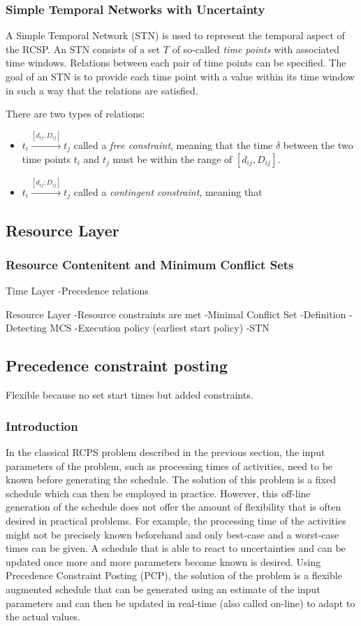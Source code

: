\documentclass{article}
\begin{document}
\subsubsection{Simple Temporal Networks with Uncertainty}
A Simple Temporal Network (STN) is used to represent the temporal aspect of the RCSP. An STN consists of a set $T$ of so-called \emph{time points} with associated time windows. Relations between each pair of time points can be specified. The goal of an STN is to provide each time point with a value within its time window in such a way that the relations are satisfied. 

There are two types of relations:
\begin{itemize}
\item $t_i \xrightarrow{[d_{ij},D_{ij}]} t_j$ called a \emph{free constraint}, meaning that the time $\delta$ between the two time points $t_i$ and $t_j$ must be within the range of $[d_{ij},D_{ij}]$.
\item $t_i \xrightarrow{[d_{ij}:D_{ij}]} t_j$ called a \emph{contingent constraint}, meaning that 
\end{itemize}

\subsection{Resource Layer}
\subsubsection{Resource Contenitent and Minimum Conflict Sets}


Time Layer
-Precedence relations

Resource Layer
-Resource constraints are met
-Minimal Conflict Set
	-Definition
-Detecting MCS
	-Execution policy (earliest start policy)
	-STN
	

\subsection{Precedence constraint posting}
Flexible because no set start times but added constraints.

\subsubsection{Introduction}
In the classical RCPS problem described in the previous section, the input parameters of the problem, such as processing times of activities, need to be known before generating the schedule. The solution of this problem is a fixed schedule which can then be employed in practice. However, this off-line generation of the schedule does not offer the amount of flexibility that is often desired in practical problems. For example, the processing time of the activities might not be precisely known beforehand and only best-case and a worst-case times can be given. A schedule that is able to react to uncertainties and can be updated once more and more parameters become known is desired. Using Precedence Constraint Posting (PCP), the solution of the problem is a flexible augmented schedule that can be generated using an estimate of the input parameters and can then be updated in real-time (also called on-line) to adapt to the actual values.
\end{document}
